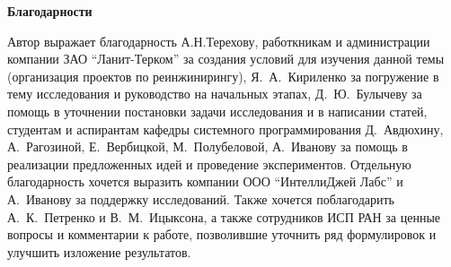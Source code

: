 \textbf{Благодарности}

Автор выражает благодарность А.Н.Терехову, работкникам и администрации компании ЗАО ``Ланит-Терком'' за создания условий для изучения данной темы (организация проектов по реинжинирингу), Я.~А.~Кириленко за погружение в тему исследования и руководство на начальных этапах, Д.~Ю.~Булычеву за помощь в уточнении постановки задачи исследования и в написании статей, студентам и аспирантам кафедры системного программирования Д.~Авдюхину, А.~Рагозиной, Е.~Вербицкой, М.~Полубеловой, А.~Иванову за помощь в реализации предложенных идей и проведение экспериментов. Отдельную благодарность  хочется выразить компании ООО ``ИнтеллиДжей Лабс'' и А.~Иванову за поддержку исследований. Также хочется поблагодарить А.~К.~Петренко и В.~М.~Ицыксона, а также сотрудников ИСП РАН за ценные вопросы и комментарии к работе, позволившие уточнить ряд формулировок и улучшить изложение результатов. 

